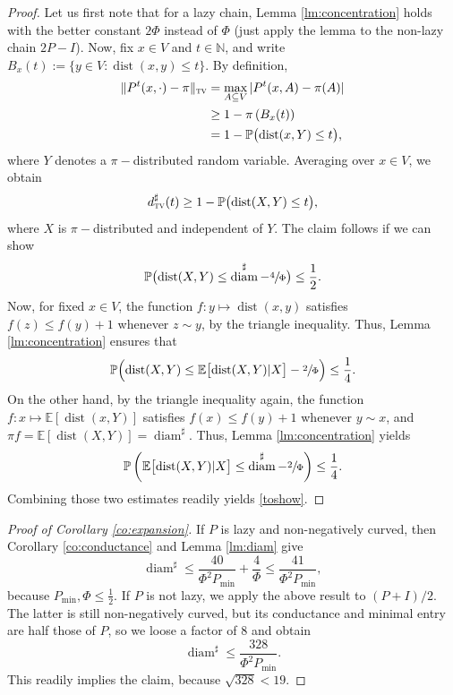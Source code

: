 \documentclass[JEP,XML,SOM,Unicode,NoEqCountersInSection,published]{cedram}
\theoremstyle{definition}
\newcommand{\dN}{\mathbb {N}}
\newcommand{\EE}{{\mathbb{E}}}
\newcommand{\PP}{{\mathbb{P}}}
\newcommand{\dtv}{d_{\textup{\textsc{tv}}}}
\newcommand{\tv}{\textup{\textsc{tv}}}
\newcommand{\pmin}{P_{\mathrm{min}}}
\DeclareMathOperator{\diam}{diam}
\DeclareMathOperator{\dist}{dist}
\begin{document}
\begin{proof}Let us first note that for a lazy chain, Lemma \ref{lm:concentration} holds with the better constant $2\Phi$ instead of $\Phi$ (just apply the lemma to the non-lazy chain $2P-I$). Now, fix $x\in V$ and $t\in\dN$, and write $B_x(t):=\{y\in V\colon \dist(x,y)\le t\}$. By definition,
\begin{align*}
\|P^t(x,\cdot)-\pi\|_\tv & = \max_{A\subseteq V}|P^t(x,A)-\pi(A)|\\
& \ge 1-\pi\left(B_x(t)\right)\\
& = 1-\PP \bigl(\dist(x,Y)\le t \bigr),
\end{align*}
where $Y$ denotes a $\pi-$distributed random variable. Averaging over $x\in V$, we obtain
\begin{equation*}
\dtv^\sharp(t) \ge 1-\PP\bigl(\dist(X,Y)\le t \bigr),
\end{equation*}
where $X$ is $\pi-$distributed and independent of $Y$. The claim follows if we can show
\begin{equation}
\label{toshow}
\PP \bigl(\dist(X,Y)\le \diam^\sharp-\sfrac{4}{\Phi} \bigr) \le \frac 12.
\end{equation}
Now, for fixed $x\in V$, the function $f\colon y\mapsto \dist(x,y)$ satisfies $f(z)\le f(y)+1$ whenever $z\sim y$, by the triangle inequality. Thus, Lemma \ref{lm:concentration} ensures that
\begin{equation*}
\PP\Bigl(\dist(X,Y)\le \EE \bigl[\dist(X,Y)|X \bigr]-\sfrac{2}{\Phi}\Bigr) \le \frac{1}{4}.
\end{equation*}
On the other hand, by the triangle inequality again, the function $f\colon x\mapsto \EE[\dist(x,Y)]$ satisfies $f(x)\le f(y)+1$ whenever $y\sim x$, and $\pi f=\EE[\dist(X,Y)]=\diam^\sharp$. Thus, Lemma \ref{lm:concentration} yields
\begin{equation*}
\PP\left(\EE \bigl[\dist(X,Y)|X \bigr]\le \diam^\sharp-\sfrac{2}{\Phi}\right) \le \frac{1}{4}.
\end{equation*}
Combining those two estimates readily yields \eqref{toshow}.
\end{proof}

\begin{proof}[Proof of Corollary \ref{co:expansion}]If $P$ is lazy and non-negatively curved, then Corollary \ref{co:conductance} and Lemma \ref{lm:diam} give
\begin{equation*}
\diam^\sharp \le \frac{40}{\Phi^2\pmin}+\frac{4}{\Phi} \le \frac{41}{\Phi^2\pmin},
\end{equation*}
because $\pmin,\Phi\le \frac 12$. If $P$ is not lazy, we apply the above result to $(P+I)/2$. The latter is still non-negatively curved, but its conductance and minimal entry are half those of $P$, so we loose a factor of $8$ and obtain
\begin{equation*}
\diam^\sharp \le \frac{328}{\Phi^2\pmin}.
\end{equation*}
This readily implies the claim, because $\sqrt{328}<19$.
\end{proof}
\end{document}
